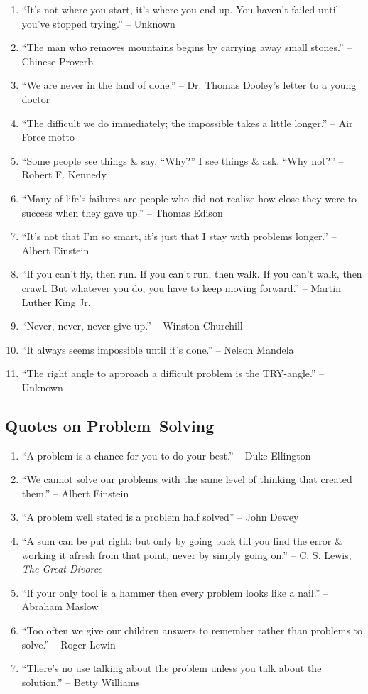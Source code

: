 \documentclass{article}
\begin{document}
\begin{enumerate}
	\item ``It's not where you start, it's where you end up. You haven't failed until you've stopped trying.'' -- Unknown
	\item ``The man who removes mountains begins by carrying away small stones.'' -- Chinese Proverb
	\item ``We are never in the land of done.'' -- Dr. Thomas Dooley's letter to a young doctor
	\item ``The difficult we do immediately; the impossible takes a little longer.'' -- Air Force motto
	\item ``Some people see things \& say, ``Why?'' I see things \& ask, ``Why not?'' -- Robert F. Kennedy
	\item ``Many of life's failures are people who did not realize how close they were to success when they gave up.'' -- Thomas Edison
	\item ``It's not that I'm so smart, it's just that I stay with problems longer.'' -- Albert Einstein
	\item ``If you can't fly, then run. If you can't run, then walk. If you can't walk, then crawl. But whatever you do, you have to keep moving forward.'' -- Martin Luther King Jr.
	\item ``Never, never, never give up.'' -- Winston Churchill
	\item ``It always seems impossible until it's done.'' -- Nelson Mandela
	\item ``The right angle to approach a difficult problem is the TRY-angle.'' -- Unknown
\end{enumerate}

\subsection{Quotes on Problem--Solving}

\begin{enumerate}
	\item ``A problem is a chance for you to do your best.'' -- Duke Ellington
	\item ``We cannot solve our problems with the same level of thinking that created them.'' -- Albert Einstein
	\item ``A problem well stated is a problem half solved'' -- John Dewey
	\item ``A sum can be put right: but only by going back till you find the error \& working it afresh from that point, never by simply going on.'' -- C. S. Lewis, {\it The Great Divorce}
	\item ``If your only tool is a hammer then every problem looks like a nail.'' -- Abraham Maslow
	\item ``Too often we give our children answers to remember rather than problems to solve.'' -- Roger Lewin
	\item ``There's no use talking about the problem unless you talk about the solution.'' -- Betty Williams
\end{enumerate}
\end{document}
